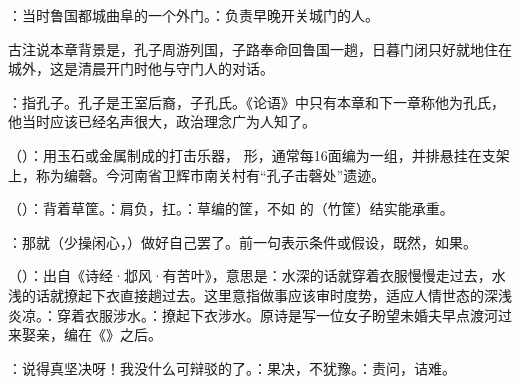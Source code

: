 {
\item {}：当时鲁国都城曲阜的一个外门。：负责早晚开关城门的人。

古注说本章背景是，孔子周游列国，子路奉命回鲁国一趟，日暮门闭只好就地住在城外，这是清晨开门时他与守门人的对话。

\item {}：指孔子。孔子是王室后裔，子孔氏。《论语》中只有本章和下一章称他为孔氏，他当时应该已经名声很大，政治理念广为人知了。
}
{}


{
\item {}（）：用玉石或金属制成的打击乐器， 形，通常每16面编为一组，并排悬挂在支架上，称为编磬。今河南省卫辉市南关村有“孔子击磬处”遗迹。
\item {}（）：背着草筐。：肩负，扛。：草编的筐，不如  的（竹筐）结实能承重。
\item {}：那就（少操闲心，）做好自己罢了。前一句表示条件或假设，既然，如果。
\item {}（）：出自《诗经·邶风·有苦叶》，意思是：水深的话就穿着衣服慢慢走过去，水浅的话就撩起下衣直接趟过去。这里意指做事应该审时度势，适应人情世态的深浅炎凉。：穿着衣服涉水。：撩起下衣涉水。原诗是写一位女子盼望未婚夫早点渡河过来娶亲，编在《》之后。
\item {}：说得真坚决呀！我没什么可辩驳的了。：果决，不犹豫。：责问，诘难。
}
{}  %


